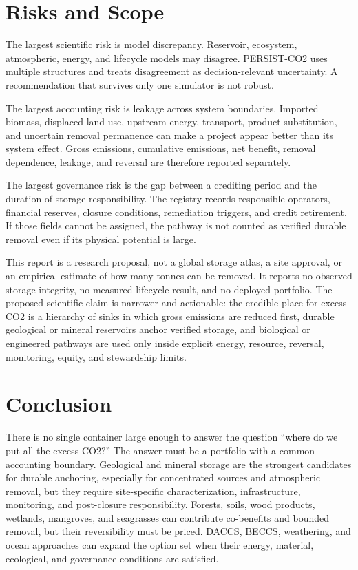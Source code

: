 \documentclass[conference]{IEEEtran}
\begin{document}
\section{Risks and Scope}
The largest scientific risk is model discrepancy. Reservoir, ecosystem, atmospheric, energy, and lifecycle models may disagree. PERSIST-CO2 uses multiple structures and treats disagreement as decision-relevant uncertainty. A recommendation that survives only one simulator is not robust.

The largest accounting risk is leakage across system boundaries. Imported biomass, displaced land use, upstream energy, transport, product substitution, and uncertain removal permanence can make a project appear better than its system effect. Gross emissions, cumulative emissions, net benefit, removal dependence, leakage, and reversal are therefore reported separately.

The largest governance risk is the gap between a crediting period and the duration of storage responsibility. The registry records responsible operators, financial reserves, closure conditions, remediation triggers, and credit retirement. If those fields cannot be assigned, the pathway is not counted as verified durable removal even if its physical potential is large.

This report is a research proposal, not a global storage atlas, a site approval, or an empirical estimate of how many tonnes can be removed. It reports no observed storage integrity, no measured lifecycle result, and no deployed portfolio. The proposed scientific claim is narrower and actionable: the credible place for excess CO2 is a hierarchy of sinks in which gross emissions are reduced first, durable geological or mineral reservoirs anchor verified storage, and biological or engineered pathways are used only inside explicit energy, resource, reversal, monitoring, equity, and stewardship limits.

\section{Conclusion}
There is no single container large enough to answer the question “where do we put all the excess CO2?” The answer must be a portfolio with a common accounting boundary. Geological and mineral storage are the strongest candidates for durable anchoring, especially for concentrated sources and atmospheric removal, but they require site-specific characterization, infrastructure, monitoring, and post-closure responsibility. Forests, soils, wood products, wetlands, mangroves, and seagrasses can contribute co-benefits and bounded removal, but their reversibility must be priced. DACCS, BECCS, weathering, and ocean approaches can expand the option set when their energy, material, ecological, and governance conditions are satisfied.
\end{document}
